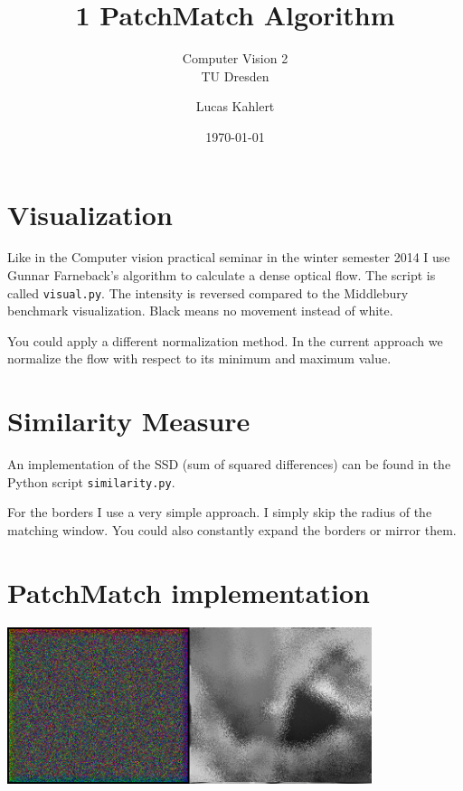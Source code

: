 \documentclass[a4paper]{scrartcl}
\title{1 PatchMatch Algorithm}
\subtitle{Computer Vision 2 \\ TU Dresden}
\author{Lucas Kahlert}
\date{\today}
\begin{document}
\maketitle


\section{Visualization}

Like in the Computer vision practical seminar in the winter semester 2014 I use
Gunnar Farneback's algorithm to calculate a dense optical flow. The script is
called \texttt{visual.py}. The intensity is reversed compared to the Middlebury
benchmark visualization. Black means no movement instead of white.

You could apply a different normalization method. In the current approach we
normalize the flow with respect to its minimum and maximum value.


\section{Similarity Measure}

An implementation of the SSD (sum of squared differences) can be found in the Python
script \texttt{similarity.py}.

For the borders I use a very simple approach. I simply skip the radius of the
matching window. You could also constantly expand the borders or mirror them.


\section{PatchMatch implementation}

\vspace{1cm}
\begin{minipage}{0.8\textwidth}
  \centering
  \includegraphics[width=0.8\textwidth]{images/flow-it-0.png}
\end{minipage}
\end{document}
